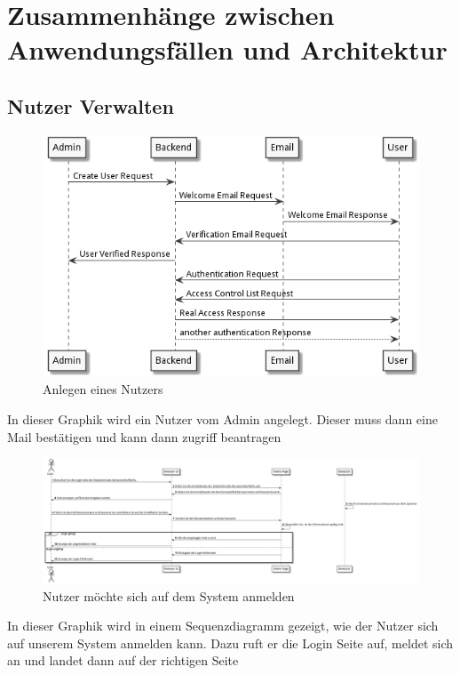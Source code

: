 \documentclass[enabledeprecatedfontcommands,fontsize=12pt,paper=a4,twoside]{scrartcl}
\begin{document}
\section[Zusammenhänge zwischen Anwendungsfällen und Architektur]{Zusammenhänge zwischen Anwendungsfällen und Architektur}
\label{sec:anwendungsfaelle}


\subsection{Nutzer Verwalten}
\begin{figure}
  \includegraphics[width=\linewidth]{UML/seq.png}
  \caption{Anlegen eines Nutzers}
  \label{fig:pkErstellen}
\end{figure}
In dieser Graphik wird ein Nutzer vom Admin angelegt. Dieser muss dann eine Mail bestätigen und kann dann zugriff beantragen


\begin{figure}
  \includegraphics[width=\linewidth]{UML/erstbenutzung.png}
  \caption{Nutzer möchte sich auf dem System anmelden}
  \label{fig:pkErstellen}
\end{figure}
In dieser Graphik wird in einem Sequenzdiagramm gezeigt, wie der Nutzer sich auf unserem System anmelden kann. Dazu ruft er die Login Seite auf, meldet sich an und landet dann auf der richtigen Seite
\end{document}
